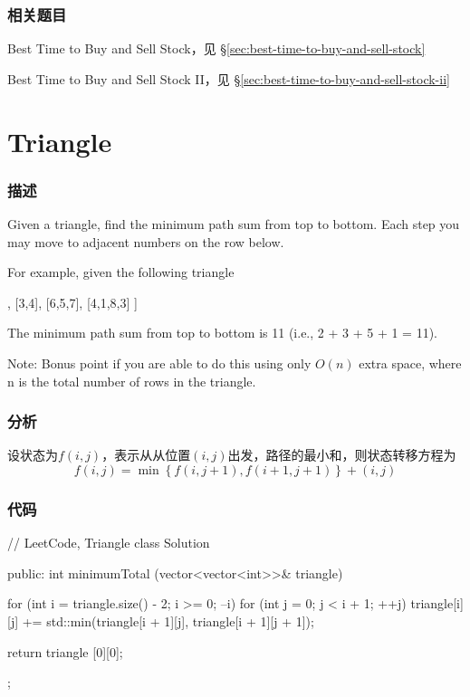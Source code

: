 \subsubsection{相关题目}
\begindot
\item Best Time to Buy and Sell Stock，见 \S \ref{sec:best-time-to-buy-and-sell-stock}
\item Best Time to Buy and Sell Stock II，见 \S \ref{sec:best-time-to-buy-and-sell-stock-ii}
\myenddot


\section{Triangle} %
\label{sec:triangle}


\subsubsection{描述}
Given a triangle, find the minimum path sum from top to bottom. Each step you may move to adjacent numbers on the row below.

For example, given the following triangle
\begin{Code}
[
     [2],
    [3,4],
   [6,5,7],
  [4,1,8,3]
]
\end{Code}
The minimum path sum from top to bottom is 11 (i.e., 2 + 3 + 5 + 1 = 11).

Note: Bonus point if you are able to do this using only $O(n)$ extra space, where n is the total number of rows in the triangle.


\subsubsection{分析}
设状态为$f(i, j)$，表示从从位置$(i,j)$出发，路径的最小和，则状态转移方程为
$$
f(i,j)=\min\left\{f(i,j+1),f(i+1,j+1)\right\}+(i,j)
$$


\subsubsection{代码}
\begin{Code}
// LeetCode, Triangle
class Solution {
public:
    int minimumTotal (vector<vector<int>>& triangle) {
        for (int i = triangle.size() - 2; i >= 0; --i)
            for (int j = 0; j < i + 1; ++j)
                triangle[i][j] += std::min(triangle[i + 1][j],
                        triangle[i + 1][j + 1]);

        return triangle [0][0];
    }
};
\end{Code}


